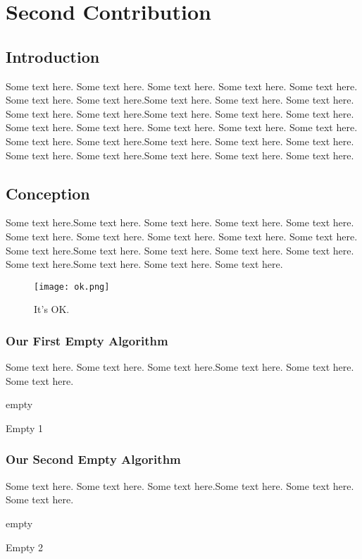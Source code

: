 \chapter{Second Contribution}


\section{Introduction}

Some text here. Some text here. Some text here. Some text here. Some text here. Some text here. Some text here.Some text here. Some text here. Some text here. Some text here. Some text here.Some text here. Some text here. Some text here. Some text here. Some text here. Some text here. Some text here. Some text here. Some text here. Some text here.Some text here. Some text here. Some text here. Some text here. Some text here.Some text here. Some text here. Some text here.

\section{Conception}
Some text here.Some text here. Some text here. Some text here. Some text here. Some text here. Some text here. Some text here. Some text here. Some text here. Some text here.Some text here. Some text here. Some text here. Some text here. Some text here.Some text here. Some text here. Some text here.


\begin{figure}[hbt!]
  \centering
  \texttt{[image: ok.png]}
  \caption{It's OK.}
  \label{fig:ok1}
\end{figure}

\subsection{Our First Empty Algorithm}
Some text here. Some text here. Some text here.Some text here. Some text here. Some text here.

\begin{algorithm}[H]
	empty
	\caption{Empty 1}
  \label{alg:1}
\end{algorithm}

\subsection{Our Second Empty Algorithm}
Some text here. Some text here. Some text here.Some text here. Some text here. Some text here.

\begin{algorithm}[H]
	empty
	\caption{Empty 2}
  \label{alg:2}
\end{algorithm}
